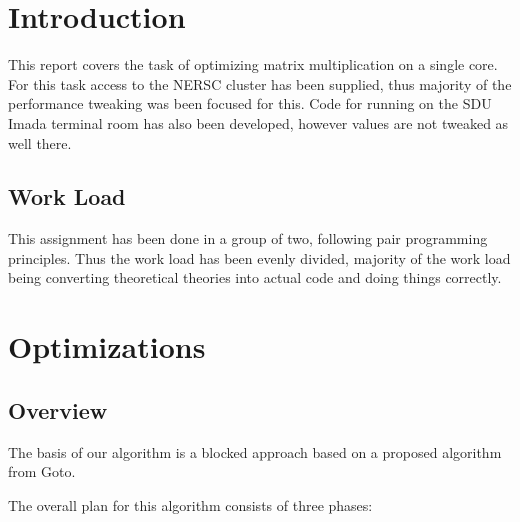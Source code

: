 \documentclass[a4paper,11pt,oneside]{book}
\begin{document}
\renewcommand{\contentsname}{Table of Contents}
\tableofcontents
\thispagestyle{empty}

\pagestyle{ruled}
\chapter{Introduction}
\setcounter{section}{1}

This report covers the task of optimizing matrix multiplication on a single
core. For this task access to the NERSC cluster has been supplied, thus majority
of the performance tweaking was been focused for this. Code for running on the
SDU Imada terminal room has also been developed, however values are not tweaked
as well there.

\section{Work Load}

This assignment has been done in a group of two, following pair programming
principles. Thus the work load has been evenly divided, majority of the work
load being converting theoretical theories into actual code and doing things
correctly.

\chapter{Optimizations}
\section{Overview}

The basis of our algorithm is a blocked approach based on a proposed algorithm
from Goto. %

The overall plan for this algorithm consists of three phases:

\end{document}
